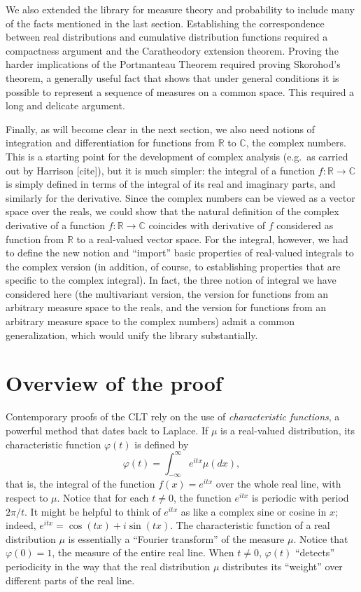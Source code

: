 \documentclass{article}
\newcommand{\RR}{\mathbb{R}}
\newcommand{\CC}{\mathbb{C}}
\newcommand{\ph}{\varphi}
\begin{document}
We also extended the library for measure theory and probability to include many of the facts mentioned in the last section. Establishing the correspondence between real distributions and cumulative distribution functions 
required a compactness argument and the Caratheodory extension theorem. Proving the harder implications of the Portmanteau Theorem required proving Skorohod's theorem, a generally useful fact that shows that under general conditions it is possible to represent a sequence of measures on a common space. This required a long and delicate argument.

Finally, as will become clear in the next section, we also need notions of integration and differentiation for functions from $\RR$ to $\CC$, the complex numbers. This is a starting point for the development of complex analysis (e.g.~as carried out by Harrison [cite]), but it is much simpler: the integral of a function $f : \RR \to \CC$ is simply defined in terms of the integral of its real and imaginary parts, and similarly for the derivative. Since the complex numbers can be viewed as a vector space over the reals, we could show that the natural definition of the complex derivative of a function $f : \RR \to \CC$ coincides with derivative of $f$ considered as function from $\RR$ to a real-valued vector space. For the integral, however, we had to define the new notion and ``import'' basic properties of real-valued integrals to the complex version (in addition, of course, to establishing properties that are specific to the complex integral). In fact, the three notion of integral we have considered here (the multivariant version, the version for functions from an arbitrary measure space to the reals, and the version for functions from an arbitrary measure space to the complex numbers) admit a common generalization, which would unify the library substantially. 


\section{Overview of the proof}

Contemporary proofs of the CLT rely on the use of \emph{characteristic functions}, a powerful method that dates back to Laplace. If $\mu$ is a real-valued distribution, its characteristic function $\ph(t)$ is defined by
\[
\ph(t) = \int_{-\infty}^{\infty} e^{itx} \mu(dx),
\]
that is, the integral of the function $f(x) = e^{itx}$ over the whole real line, with respect to $\mu$. Notice that for each $t \neq 0$, the function $e^{itx}$ is periodic with period $2 \pi / t$. It might be helpful to think of $e^{itx}$ as like a complex sine or cosine in $x$; indeed, $e^{itx}= \cos (t x) + i \sin (t x)$. The characteristic function of a real distribution $\mu$ is essentially a ``Fourier transform'' of the measure $\mu$. Notice that $\ph(0) = 1$, the measure of the entire real line. When $t \neq 0$, $\ph(t)$ ``detects'' periodicity in the way that the real distribution $\mu$ distributes its ``weight'' over different parts of the real line. 
\end{document}

